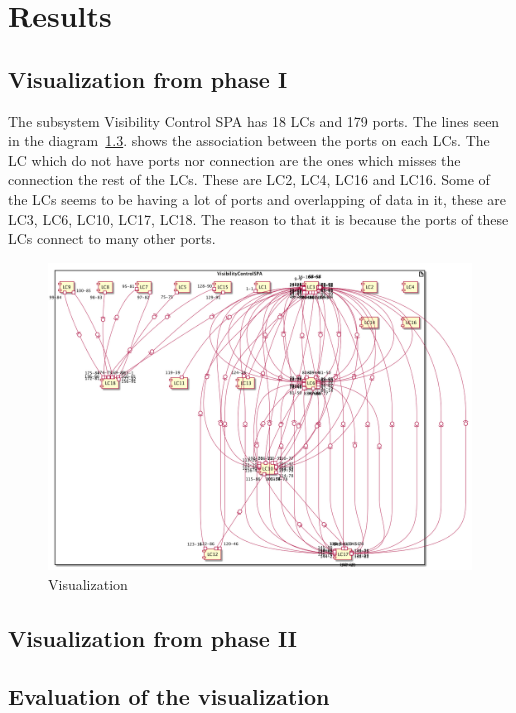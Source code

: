 \chapter{Results}

\section{Visualization from phase I}
The subsystem Visibility Control SPA has 18 LCs and 179 ports. The lines seen in the diagram~\ref{}. shows the association between the ports on each LCs. The LC which do not have ports nor connection are the ones which misses the connection the rest of the LCs. These are LC2, LC4, LC16 and LC16. Some of the LCs seems to be having a lot of ports and overlapping of data in it, these are LC3, LC6, LC10, LC17, LC18. The reason to that it is because the ports of these LCs connect to many other ports.  
\todo{[to be filled in]}


\begin{figure}[H]
\centering
\captionsetup{justification=centering}
\vspace{0cm}%
\includegraphics[width=1\linewidth]{figure/results/visualization_1.png}
\caption{Visualization}
\end{figure}

\todo{[to be filled in]}


\section{Visualization from phase II}
\todo{[to be filled in]}


\section{Evaluation of the visualization}
\todo{[to be filled in]}
